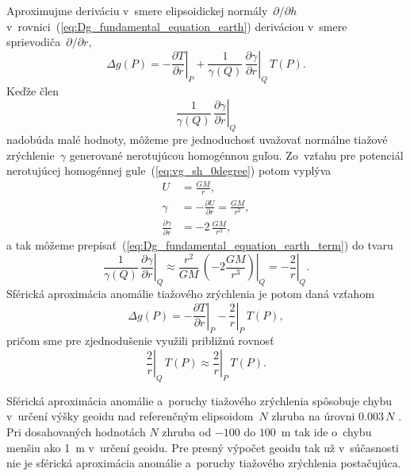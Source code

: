 \documentclass[a4paper, 12pt]{book}
\begin{document}
Aproximujme deriváciu v~smere elipsoidickej normály~$\partial \slash \partial 
h$ v~rovnici~(\ref{eq:Dg_fundamental_equation_earth}) deriváciou v~smere 
sprievodiča~$\partial \slash \partial r$,
%
\begin{equation}
\Delta g(P) = -\left.\frac{\partial T}{\partial r}\right|_{P} 
+ \frac{1}{\gamma(Q)} \, \left.\frac{\partial \gamma}{\partial r}\right|_{Q} \, 
T(P){.}
\end{equation}
%
Keďže člen
%
\begin{equation}
\label{eq:Dg_fundamental_equation_earth_term}
\left.\frac{1}{\gamma(Q)} \, \frac{\partial \gamma}{\partial r}\right|_Q
\end{equation}
%
nadobúda malé hodnoty, môžeme pre jednoduchosť uvažovať normálne tiažové 
zrýchlenie~$\gamma$ generované nerotujúcou homogénnou guľou.  Zo~vzťahu pre 
potenciál nerotujúcej homogénnej gule~(\ref{eq:vg_sh_0degree}) potom vyplýva
%
\begin{align}
U &= \frac{GM}{r}{,}\\
%
\gamma &= -\frac{\partial U}{\partial r} = \frac{GM}{r^2}{,}\\
%
\frac{\partial \gamma}{\partial r} &= -2 \, \frac{GM}{r^3}{,}
\end{align}
%
a tak môžeme prepísať~(\ref{eq:Dg_fundamental_equation_earth_term}) do tvaru
%
\begin{equation}
\left.\frac{1}{\gamma(Q)} \, \frac{\partial \gamma}{\partial r}\right|_Q 
\approx \left.\frac{r^2}{GM} \, \left( -2\frac{GM}{r^3} \right)\right|_Q 
= -\left.\frac{2}{r}\right|_Q {.}
\end{equation}
%
Sférická aproximácia anomálie tiažového zrýchlenia je potom daná vzťahom
%
\begin{equation}
\label{eq:Dg_fundamental_equation_earth_sph}
\Delta g(P) = -\left.\frac{\partial T}{\partial r}\right|_{P} 
- \left.\frac{2}{r}\right|_{P} \, T(P){,}
\end{equation}
%
pričom sme pre zjednodušenie využili približnú rovnosť
%
\begin{equation}
\left.\frac{2}{r}\right|_Q \, T(P) \approx \left.\frac{2}{r}\right|_P \, 
T(P){.}
\end{equation}

Sférická aproximácia anomálie a~poruchy tiažového zrýchlenia spôsobuje chybu 
v~určení výšky geoidu nad referenčným elipsoidom~$N$ zhruba na úrovni $0.003 \, 
N$ \parencite{MoritzPhysicalGeodesy}.  Pri dosahovaných hodnotách $N$ zhruba od 
$-100$ do $100$~m tak ide o~chybu menšiu ako 1~m v~určení geoidu.  Pre presný 
výpočet geoidu tak už v~súčasnosti nie je sférická aproximácia anomálie 
a~poruchy tiažového zrýchlenia postačujúca.
\end{document}
